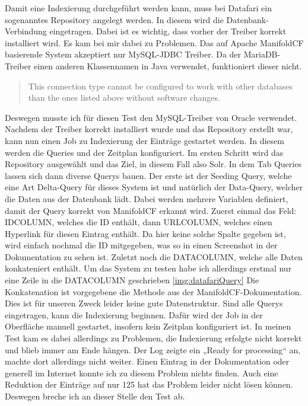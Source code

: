Damit eine Indexierung durchgeführt werden kann, muss bei Datafari ein sogenanntes Repository angelegt werden. In diesem wird die Datenbank-Verbindung eingetragen. Dabei ist es wichtig, dass vorher der Treiber korrekt installiert wird. Es kam bei mir dabei zu Problemen. 
Das auf Apache ManifoldCF basierende System akzeptiert nur MySQL-JDBC Treiber. Da der MariaDB-Treiber einen anderen Klassennamen in Java verwendet, funktioniert dieser nicht. \begin{quote} This connection type cannot be configured to work with other databases than the ones listed above without software changes.~\cite[S.~61]{ApacheSoftwareFoundation.}\end{quote} Deswegen musste ich für diesen Test den MySQL-Treiber von Oracle verwendet.
Nachdem der Treiber korrekt installiert wurde und das Repository erstellt war, kann nun einen Job zu Indexierung der Einträge gestartet werden. In diesem werden die Queries und der Zeitplan konfiguriert.
Im ersten Schritt wird das Repository ausgewählt und das Ziel, in diesem Fall also Solr. In dem Tab Queries lassen sich dann diverse Querys bauen. Der erste ist der Seeding Query, welche eine Art Delta-Query für dieses System ist und natürlich der Data-Query, welcher die Daten aus der Datenbank lädt. Dabei werden mehrere Variablen definiert, damit der Query korrekt von ManifoldCF erkannt wird. Zuerst einmal das Feld: IDCOLUMN, welches die ID enthält, dann URLCOLUMN, welches einen Hyperlink für diesen Eintrag enthält. Da hier keine solche Spalte gegeben ist, wird einfach nochmal die ID mitgegeben, was so in einen Screenshot in der Dokumentation zu sehen ist. Zuletzt noch die DATACOLUMN, welche alle Daten konkateniert enthält. Um das System zu testen habe ich allerdings erstmal nur eine Zeile in die DATACOLUMN geschrieben \ref{img:datafariQuery} Die Konkatenation ist vorgegebene die Methode aus der ManifoldCF-Dokumentation. \cite[S.~97]{ApacheSoftwareFoundation.} Dies ist für unseren Zweck leider keine gute Datenstruktur.
Sind alle Querys eingetragen, kann die Indexierung beginnen. Dafür wird der Job in der Oberfläche manuell gestartet, insofern kein Zeitplan konfiguriert ist. In meinen Test kam es dabei allerdings zu Problemen, die Indexierung erfolgte nicht korrekt und blieb immer am Ende hängen. Der Log zeigte ein „Ready for processing“ an, machte dort allerdings nicht weiter. Einen Eintrag in der Dokumentation oder generell im Internet konnte ich zu diesem Problem nichts finden. Auch eine Reduktion der Einträge auf nur 125 hat das Problem leider nicht lösen können. Deswegen breche ich an dieser Stelle den Test ab. 

